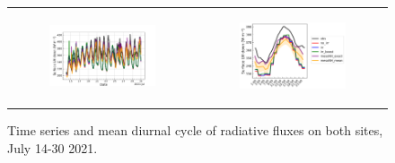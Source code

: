 \begin{figure}[hbtp]
\begin{tabular}{cc}
        \begin{subfigure}[t]{0.5\textwidth}
            \caption{}
            \includegraphics[width=\textwidth]{images/chap5/SOP_TS_DC/time_series_elsplans_LWdnSFC.png}
        \end{subfigure} &
        \begin{subfigure}[t]{0.5\textwidth}
            \caption{}
            \includegraphics[width=\textwidth]{images/chap5/SOP_TS_DC/diurnal_cycle_elsplans_LWdnSFC.png}
        \end{subfigure} \\
    \end{tabular}
    \caption{Time series and mean diurnal cycle of radiative fluxes on both sites, July 14-30 2021.}
    \label{fig:bothsites_rad}
\end{figure}


